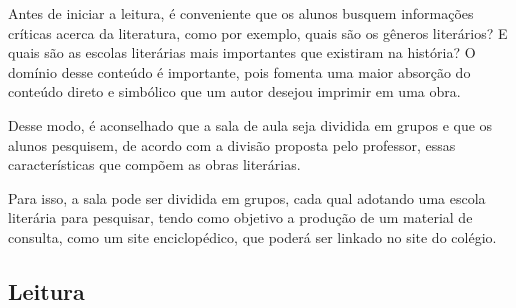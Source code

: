 \documentclass[12pt]{extarticle}
\begin{document}

Antes de iniciar a leitura, é conveniente que os alunos
busquem informações críticas acerca da literatura, como por exemplo,
quais são os gêneros literários? E quais são as escolas literárias mais
importantes que existiram na história? O domínio desse conteúdo é
importante, pois fomenta uma maior absorção do conteúdo direto e
simbólico que um autor desejou imprimir em uma obra.

Desse modo, é aconselhado que a sala de aula seja dividida em grupos e
que os alunos pesquisem, de acordo com a divisão proposta pelo
professor, essas características que compõem as obras literárias.

Para isso, a sala pode ser dividida em grupos, cada qual adotando uma
escola literária para pesquisar, tendo como objetivo a produção de um
material de consulta, como um site enciclopédico, que poderá ser linkado
no site do colégio.

\subsection{Leitura}


\end{document}
